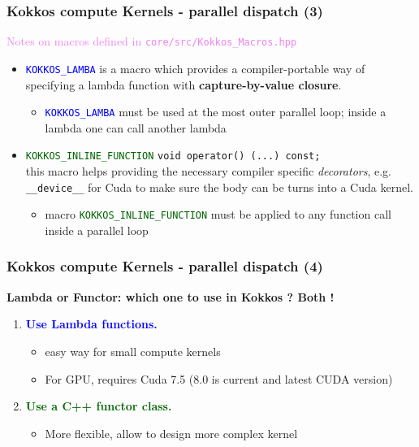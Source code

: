 \begin{frame}[fragile=singleslide]
  \frametitle{Kokkos compute Kernels - parallel dispatch (3)}

  {\Large \textcolor{violet}{Notes on macros defined in \texttt{core/src/Kokkos\_Macros.hpp}}}

  \begin{itemize}
  \item \textcolor{blue}{\texttt{KOKKOS\_LAMBA}} is a macro which provides a compiler-portable way of specifying a lambda function with \textbf{capture-by-value closure}.
    \begin{itemize}
    \item \textcolor{blue}{\texttt{KOKKOS\_LAMBA}} must be used at the most outer parallel loop; inside a lambda one can call another lambda
    \end{itemize}
  \item \textcolor{darkgreen}{\texttt{KOKKOS\_INLINE\_FUNCTION}} \texttt{void operator() (...) const;}\\
    this macro helps providing the necessary compiler specific \textit{decorators}, e.g. \texttt{\_\_device\_\_} for Cuda to make sure the body can be turns into a Cuda kernel.
    \begin{itemize}
    \item macro \textcolor{darkgreen}{\texttt{KOKKOS\_INLINE\_FUNCTION}} must be applied to any function call inside a parallel loop
    \end{itemize}
  \end{itemize}

\end{frame}

\begin{frame}[fragile=singleslide]
  \frametitle{Kokkos compute Kernels - parallel dispatch (4)}


  \textbf{Lambda or Functor: which one to use in Kokkos ? Both !}
  \begin{enumerate}
  \item \textcolor{blue}{\textbf{Use Lambda functions.}}\\
    \begin{itemize}
    \item easy way for small compute kernels
    \item For GPU, requires Cuda 7.5 (8.0 is current and latest CUDA version)
    \end{itemize}
  \item \textcolor{darkgreen}{\textbf{Use a C++ functor class.}}\\
    \begin{itemize}
    \item More flexible, allow to design more complex kernel
    \end{itemize}
  \end{enumerate}
\end{frame}

